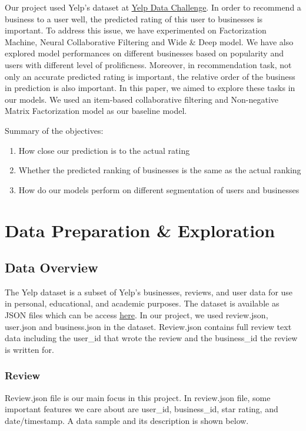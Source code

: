 \documentclass[journal]{IEEEtran}
\begin{document}
Our project used Yelp's dataset at \href{https://www.yelp.com/dataset/challenge}{\underline{Yelp Data Challenge}}. In order to recommend a business to a user well, the predicted rating of this user to businesses is important. To address this issue, we have experimented on Factorization Machine, Neural Collaborative Filtering and Wide \& Deep model. We have also explored model performances on different businesses based on popularity and users with different level of prolificness. Moreover, in recommendation task, not only an accurate predicted rating is important, the relative order of the business in prediction is also important. In this paper, we aimed to explore these tasks in our models. We used an item-based collaborative filtering and Non-negative Matrix Factorization model as our baseline model. 

Summary of the objectives:
\begin{enumerate}
    \item How close our prediction is to the actual rating
    \item Whether the predicted ranking of businesses is the same as the actual ranking
    \item How do our models perform on different segmentation of users and businesses
\end{enumerate}


\section{Data Preparation \& Exploration}

\subsection{Data Overview}
The Yelp dataset is a subset of Yelp’s businesses, reviews, and user data for use in personal, educational, and academic purposes. The dataset is available as JSON files which can be access \href{https://www.yelp.com/dataset}{\underline{here}}. In our project, we used review.json, user.json and business.json in the dataset. Review.json contains full review text data including the user\_id that wrote the review and the business\_id the review is written for.

\subsubsection{Review}
Review.json file is our main focus in this project. In review.json file, some important features we care about are user\_id, business\_id, star rating, and date/timestamp. A data sample and its description is shown below. 
\end{document}
